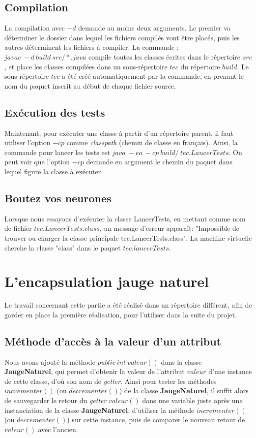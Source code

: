 \documentclass[a4paper,11pts]{article}
\begin{document}
\subsection{Compilation}
La compilation avec $-d$ demande au moins deux arguments. Le premier va déterminer le dossier dans lequel les fichiers compilés vont être placés, puis les autres déterminent les fichiers à compiler. La commande : $javac\ -d\ build\ src/*.java$ compile toutes les classes écrites dans le répertoire $src$, et place les classes compilées dans un sous-répertoire $tec$ du répertoire $build$. Le sous-répertoire $tec$ a été créé automatiquement par la commande, en prenant le nom du paquet inscrit au début de chaque fichier source.

\subsection{Exécution des tests}
Maintenant, pour exécuter une classe à partir d'un répertoire parent, il faut utiliser l'option $-cp$ comme \textit{classpath} (chemin de classe en français). Ainsi, la commande pour lancer les tests est $java\ -ea\ -cp\ build/\ tec.LancerTests$. On peut voir que l'option $-cp$ demande en argument le chemin du paquet dans lequel figure la classe à exécuter.

\subsection{Boutez vos neurones}
Lorsque nous essayons d'exécuter la classe LancerTests, en mettant comme nom de fichier $tec.LancerTests.class$, un message d'erreur apparaît: "Impossible de trouver ou charger la classe principale tec.LancerTests.class". La machine virtuelle cherche la classe "class" dans le paquet $tec.lancerTests$.

\section{L'encapsulation jauge naturel}
Le travail concernant cette partie a été réalisé dans un répertoire différent, afin de garder en place la première réalisation, pour l'utiliser dans la suite du projet.

\subsection{Méthode d’accès à la valeur d’un attribut}
Nous avons ajouté la méthode $public\ int\ valeur()$ dans la classe \textbf{JaugeNaturel}, qui permet d'obtenir la valeur de l'attribut $valeur$ d'une instance de cette classe, d'où son nom de \textit{getter}. Ainsi pour tester les méthodes $incrementer()$ (ou $decrementer()$) de la classe \textbf{JaugeNaturel}, il suffit alors de sauvegarder le retour du \textit{getter} $valeur()$ dans une variable juste après une instanciation de la classe \textbf{JaugeNaturel}, d'utiliser la méthode $incrementer()$ (ou $decrementer()$) sur cette instance, puis de comparer le nouveau retour de $valeur()$ avec l'ancien.
\end{document}
